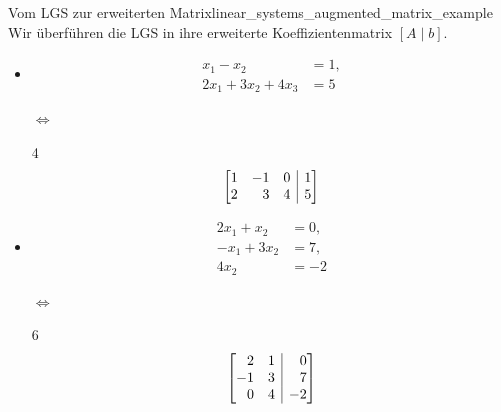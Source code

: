 \begin{ExampleBox}{Vom LGS zur erweiterten Matrix}{linear_systems_augmented_matrix_example}
  Wir überführen die LGS in ihre erweiterte Koeffizientenmatrix $[A\mid b]$.
  \begin{itemize}[leftmargin=1.4em,itemsep=0.8em]
    \item
      \noindent
      \begin{minipage}[c]{0.47\linewidth}
        \[
          \begin{aligned}
             x_1-x_2       &=1,\\
            2x_1+3x_2+4x_3&=5
          \end{aligned}
        \]
      \end{minipage}%
      \begin{minipage}[c]{0.08\linewidth}
        \centering $\Longleftrightarrow$
      \end{minipage}%
      \begin{minipage}[c]{0.42\linewidth}
        \begin{ClozeArea}[12]{4}
          \centering
          \[
            \left[
              \begin{array}{@{}rrr|r@{}}
                1&-1&0&1\\
                2& 3&4&5
              \end{array}
            \right]
          \]
        \end{ClozeArea}
      \end{minipage}

    \item
      \noindent
      \begin{minipage}[c]{0.47\linewidth}
        \[
          \begin{aligned}
             2x_1+x_2&= 0,\\
              -x_1+3x_2&= 7,\\
                   4x_2&=-2
          \end{aligned}
        \]
      \end{minipage}%
      \begin{minipage}[c]{0.08\linewidth}
        \centering $\Longleftrightarrow$
      \end{minipage}%
      \begin{minipage}[c]{0.42\linewidth}
        \begin{ClozeArea}[12]{6}
          \centering
          \[
            \left[
              \begin{array}{@{}rr|r@{}}
                 2&1& 0\\
                -1&3& 7\\
                 0&4&-2
              \end{array}
            \right]
          \]
        \end{ClozeArea}
      \end{minipage}
  \end{itemize}
\end{ExampleBox}
